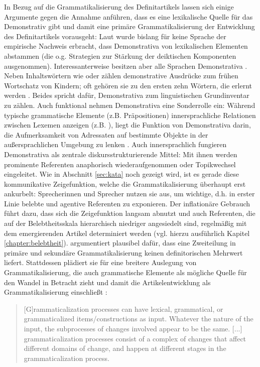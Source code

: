 In Bezug auf die Grammatikalisierung des Definitartikels lassen sich einige Argumente gegen die Annahme anführen, dass es eine lexikalische Quelle für das Demonstrativ gibt und damit eine primäre Grammatikalisierung der Entwicklung des Definitartikels vorausgeht: Laut \textcite[150]{Diessel1999} wurde bislang für keine Sprache der empirische Nachweis erbracht, dass Demonstrativa von lexikalischen Elementen abstammen (die o.g. Strategien zur Stärkung der deiktischen Komponenten ausgenommen). Interessanterweise besitzen aber alle Sprachen  Demonstrativa \parencite[1]{Diessel1999}. Neben Inhaltswörtern wie  oder  zählen demonstrative Ausdrücke zum frühen Wortschatz von Kindern; oft gehören sie zu den ersten zehn Wörtern, die erlernt werden \parencite[476]{Diessel2006}. Beides spricht dafür, Demonstrativa zum linguistischen Grundinventar zu zählen. Auch funktional nehmen Demonstrativa eine Sonderrolle ein: Während typische grammatische Elemente (z.B. Präpositionen) innersprachliche Relationen zwischen Lexemen anzeigen (z.B. ), liegt die Funktion von Demonstrativa darin, die Aufmerksamkeit von Adressaten auf bestimmte Objekte in der außersprachlichen Umgebung zu lenken \parencites{Diessel2006}. 
Auch innersprachlich fungieren Demonstrativa als zentrale diskursstrukturierende Mittel: Mit ihnen werden prominente Referenten anaphorisch wiederaufgenommen oder Topikwechsel eingeleitet. Wie in Abschnitt \ref{sec:kata} noch gezeigt wird, ist es gerade diese kommunikative Zeigefunktion, welche die Grammatikalisierung überhaupt erst ankurbelt: Sprecherinnen und Sprecher nutzen sie aus, um wichtige, d.h. in erster Linie belebte und agentive Referenten zu exponieren. Der inflationäre Gebrauch führt dazu, dass sich die Zeigefunktion langsam abnutzt und auch Referenten, die auf der Belebtheitsskala hierarchisch niedriger angesiedelt sind, regelmäßig mit dem emergierenden Artikel determiniert werden (vgl. hierzu ausführlich Kapitel \ref{chapter:belebtheit}).
\textcite{Breban2014} argumentiert plausibel dafür, dass eine Zweiteilung in primäre und sekundäre Grammatikalisierung keinen definitorischen Mehrwert liefert.
Stattdessen plädiert sie für eine breitere Auslegung von Grammatikalisierung, die auch grammatische Elemente als mögliche Quelle für den Wandel in Betracht zieht und damit die Artikelentwicklung als Grammatikalisierung einschließt  \parencite[zur weiterführenden Diskussion s.][]{Breban2012}: \blockcquote[498]{Breban2014}{[G]rammaticalization processes can have lexical, grammatical, or grammaticalized items/constructions as input. Whatever the nature of the input, the subprocesses of changes involved appear to be the same. [...] grammaticalization processes consist of a complex of changes that affect different domains of change, and happen at different stages in the grammaticalization process.}

